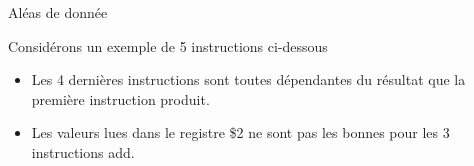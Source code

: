 %
\begin{Frame}{Aléas de donnée}

\begin{block}{Considérons un exemple de 5 instructions ci-dessous}
       \begin{center}
 	\begin{itemize}
          \item Les 4 dernières instructions sont toutes dépendantes du résultat que la première instruction produit.
          \item Les valeurs lues dans le registre \$2 ne sont pas les bonnes pour les 3 instructions add.
        \end{itemize}
       \end{center}
      \end{block}   

\vspace{-0.1cm}
        \begin{center}
        \end{center}
 


\end{Frame}


